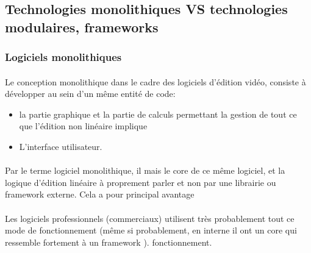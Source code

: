 \subsection {Technologies monolithiques VS technologies
modulaires, frameworks}


\subsubsection{Logiciels monolithiques } %

\paragraph{}

Le conception monolithique  dans le cadre des
logiciels d'édition vidéo, consiste à développer au sein d'un même
entité de code:

\begin{itemize} \setlength{\itemsep}{2mm}

  \item {la partie graphique et la partie de calculs
    permettant la gestion de tout ce que l'édition non linéaire
    implique}

  \item {L'interface utilisateur.}

\end {itemize}

\paragraph{}

Par le terme logiciel monolithique, il %
mais le core de ce même logiciel, et la logique d'édition linéaire
à proprement parler %
et non par une librairie ou framework  externe. Cela a
pour principal avantage %

\paragraph{}

Les logiciels professionnels (commerciaux) utilisent très probablement
tout ce mode de fonctionnement (même si probablement, en interne il ont
un core qui ressemble fortement à un framework ).%
fonctionnement.

